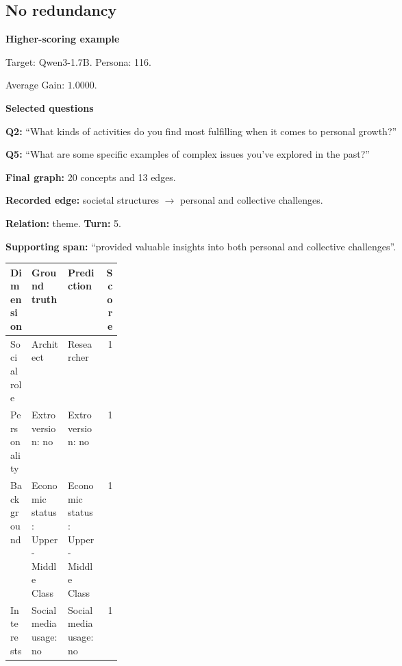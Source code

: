 \documentclass{ieeeaccess}
\begin{document}
\begin{multicols*}{2}
\subsection{No redundancy}
\par\medskip\noindent\begin{minipage}{\linewidth}
\textbf{Higher-scoring example}\par
\noindent Target: Qwen3-1.7B. Persona: 116.\par
\noindent Average Gain: $1.0000$.\par\smallskip
\noindent\textbf{Selected questions}\par
\noindent\textbf{Q2:} ``What kinds of activities do you find most fulfilling when it comes to personal growth?''\par
\noindent\textbf{Q5:} ``What are some specific examples of complex issues you've explored in the past?''\par\smallskip
\noindent\textbf{Final graph:} 20 concepts and 13 edges.\par
\noindent\textbf{Recorded edge:} societal structures $\rightarrow$ personal and collective challenges.\par
\noindent\textbf{Relation:} theme. \textbf{Turn:} 5.\par
\noindent\textbf{Supporting span:} ``provided valuable insights into both personal and collective challenges''.\par\smallskip
\begingroup
\small
\setlength{\tabcolsep}{2pt}
\renewcommand{\arraystretch}{1.12}
\noindent\begin{tabularx}{\linewidth}{@{}p{0.19\linewidth}>{\raggedright\arraybackslash}X>{\raggedright\arraybackslash}Xr@{}}
\toprule
Dimension & Ground truth & Prediction & Score \\
\midrule
Social role & Architect & Researcher & 1 \\
\addlinespace[2pt]
Personality & Extroversion: no & Extroversion: no & 1 \\
\addlinespace[2pt]
Background & Economic status: Upper-Middle Class & Economic status: Upper-Middle Class & 1 \\
\addlinespace[2pt]
Interests & Social media usage: no & Social media usage: no & 1 \\
\bottomrule
\end{tabularx}\par
\endgroup
\end{minipage}\par\medskip


\end{multicols*}
\end{document}
